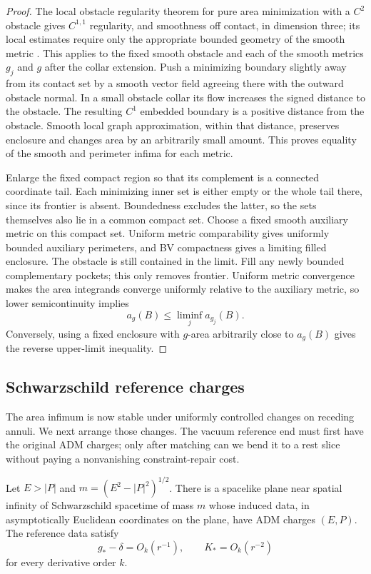 \begin{proof}
The local obstacle regularity theorem for pure area minimization with
a $C^2$ obstacle gives $C^{1,1}$ regularity, and smoothness off contact,
in dimension three; its local estimates require only the appropriate
bounded geometry of the smooth metric
\cite[Regularity Theorem 1.3]{HuiskenIlmanen2001}.
This applies to the fixed smooth obstacle and each of the smooth
metrics $g_j$ and $g$ after the collar extension. Push a minimizing
boundary slightly away from its contact set by a smooth vector field agreeing
there with the outward obstacle normal.  In a small obstacle collar its
flow increases the signed distance to the obstacle.  The resulting
$C^1$ embedded boundary is a positive distance from the obstacle.
Smooth local graph approximation, within that distance, preserves
enclosure and changes area by an arbitrarily small amount.  This proves
equality of the smooth and perimeter infima for each metric.

Enlarge the fixed compact region so that its complement is a connected
coordinate tail. Each minimizing inner set is either empty or the whole
tail there, since its frontier is absent. Boundedness excludes the latter,
so the sets themselves also lie in a common compact set.
Choose a fixed smooth auxiliary metric on this compact set. Uniform
metric comparability gives uniformly bounded auxiliary perimeters, and
BV compactness gives a limiting filled enclosure. The obstacle is still
contained in the limit. Fill any newly bounded complementary pockets;
this only removes frontier. Uniform metric convergence makes the area
integrands converge uniformly relative to the auxiliary metric, so lower
semicontinuity implies
\[
 a_g(B)\le\liminf_j a_{g_j}(B).
\]
Conversely, using a fixed enclosure with $g$-area arbitrarily close to
$a_g(B)$ gives the reverse upper-limit inequality.
\end{proof}

\subsection{Schwarzschild reference charges}

The area infimum is now stable under uniformly controlled changes on
receding annuli. We next arrange those changes. The vacuum reference end
must first have the original ADM charges; only after matching can we bend
it to a rest slice without paying a nonvanishing constraint-repair cost.

\begin{lemma}
\label{n3:reduction:boosted-reference}
Let $E>|P|$ and $m=(E^2-|P|^2)^{1/2}$.  There is a spacelike plane
near spatial infinity of Schwarzschild spacetime of mass $m$ whose
induced data, in asymptotically Euclidean coordinates on the plane,
have ADM charges $(E,P)$.  The reference data satisfy
\[
 g_*-\delta=O_k(r^{-1}),\qquad K_*=O_k(r^{-2})
\]
for every derivative order $k$.
\end{lemma}

